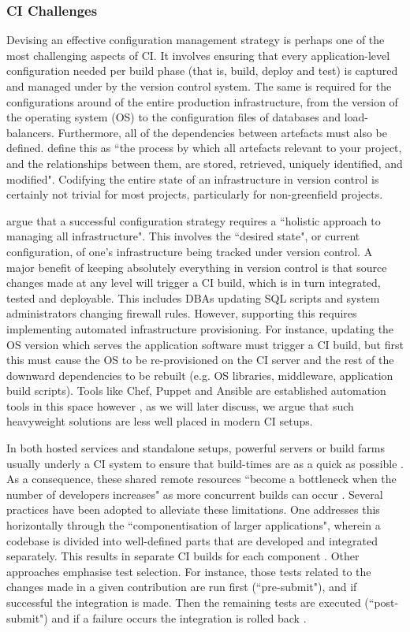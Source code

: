 \documentclass{report}
\begin{document}
\subsubsection{CI Challenges}
Devising an effective configuration management strategy is perhaps one of the
most challenging aspects of CI. It involves ensuring that every application-level configuration
needed per build phase (that is, build, deploy and test) is captured and managed under by the
version control system. The same is required for the configurations around of the entire
production infrastructure, from the version of the operating system (OS)
to the configuration files of databases and load-balancers. Furthermore, all of 
the dependencies between artefacts must also be defined. \cite{Jez}
define this as ``the process by which all artefacts relevant to
your project, and the relationships between them, are stored, retrieved, uniquely
identified, and modified". Codifying the entire state of an infrastructure in
version control is certainly not trivial for most projects, particularly for non-greenfield projects.
\par
\cite{Jez} argue that a successful configuration strategy requires a ``holistic approach to 
managing all infrastructure". This involves the ``desired state", or current configuration, of 
one's infrastructure being tracked under version control. A major benefit of keeping
absolutely everything in version control is that source 
changes made at any level will trigger a CI build, which is in turn integrated, tested and deployable. 
This includes DBAs updating SQL scripts and system administrators changing firewall 
rules. However, supporting this requires implementing automated infrastructure provisioning.
For instance, updating the OS version which serves the application software
must trigger a CI build, but first this must cause 
the OS to be re-provisioned on the CI server and the rest of the downward dependencies 
to be rebuilt (e.g. OS libraries, middleware, application build scripts).  Tools like Chef, Puppet 
and Ansible are established automation tools in this space however \citep{Rensin}, as we will later discuss, 
we argue that such heavyweight solutions are less well placed in modern CI setups.
\par
In both hosted services and standalone setups, powerful servers or build farms usually 
underly a CI system to ensure that build-times are as a quick as possible \citep{Campos}. As a consequence,
these shared remote resources ``become a bottleneck when the number
of developers increases" as more concurrent builds can occur \citep{Gambi}. Several practices have
been adopted to alleviate these limitations. One addresses this horizontally through the ``componentisation of larger
applications", wherein a codebase is divided into well-defined parts that are developed 
and integrated separately. This results in separate CI builds for each component \citep{Jez}.
Other approaches emphasise test selection. For instance, those tests related to the changes made in a given contribution
are run first (``pre-submit"), and if successful the integration is made. Then the remaining tests are executed (``post-submit") and if a failure occurs the integration is rolled back \citep{Elbaum}.
\end{document}

